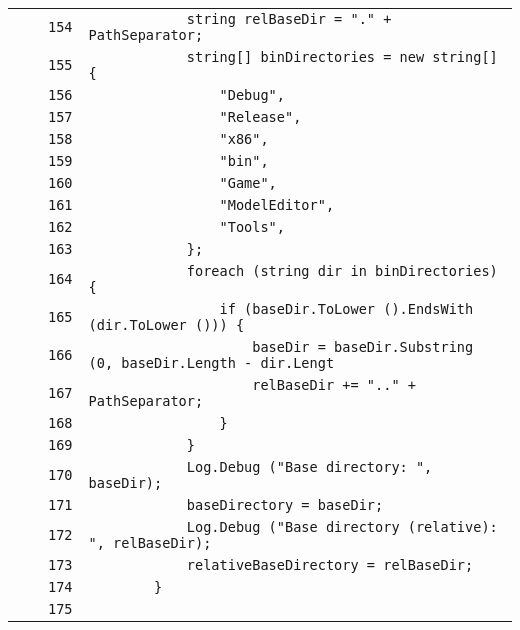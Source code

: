 \documentclass[a4paper,10pt]{article}
\begin{document}
\begin{longtable}[l]{lrrl}
\cellcolor{gray} &  & \verb~154~ & \verb~            string relBaseDir = "." + PathSeparator;~\\
\cellcolor{gray} &  & \verb~155~ & \verb~            string[] binDirectories = new string[] {~\\
\cellcolor{gray} &  & \verb~156~ & \verb~                "Debug",~\\
\cellcolor{gray} &  & \verb~157~ & \verb~                "Release",~\\
\cellcolor{gray} &  & \verb~158~ & \verb~                "x86",~\\
\cellcolor{gray} &  & \verb~159~ & \verb~                "bin",~\\
\cellcolor{gray} &  & \verb~160~ & \verb~                "Game",~\\
\cellcolor{gray} &  & \verb~161~ & \verb~                "ModelEditor",~\\
\cellcolor{gray} &  & \verb~162~ & \verb~                "Tools",~\\
\cellcolor{gray} &  & \verb~163~ & \verb~            };~\\
\cellcolor{gray} &  & \verb~164~ & \verb~            foreach (string dir in binDirectories) {~\\
\cellcolor{gray} &  & \verb~165~ & \verb~                if (baseDir.ToLower ().EndsWith (dir.ToLower ())) {~\\
\cellcolor{gray} &  & \verb~166~ & \verb~                    baseDir = baseDir.Substring (0, baseDir.Length - dir.Lengt~\\
\cellcolor{gray} &  & \verb~167~ & \verb~                    relBaseDir += ".." + PathSeparator;~\\
\cellcolor{gray} &  & \verb~168~ & \verb~                }~\\
\cellcolor{gray} &  & \verb~169~ & \verb~            }~\\
\cellcolor{gray} &  & \verb~170~ & \verb~            Log.Debug ("Base directory: ", baseDir);~\\
\cellcolor{gray} &  & \verb~171~ & \verb~            baseDirectory = baseDir;~\\
\cellcolor{gray} &  & \verb~172~ & \verb~            Log.Debug ("Base directory (relative): ", relBaseDir);~\\
\cellcolor{gray} &  & \verb~173~ & \verb~            relativeBaseDirectory = relBaseDir;~\\
\cellcolor{gray} &  & \verb~174~ & \verb~        }~\\
\cellcolor{gray} &  & \verb~175~ & \verb~~\\

\end{longtable}
\end{document}
